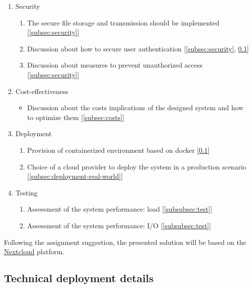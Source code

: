 \begin{enumerate}
    \item{Security}
    \begin{enumerate}
        \itemsep0em
        \item The secure file storage and transmission should be implemented [\ref{subsec:security}]
        \item Discussion about how to secure user authentication [\ref{subsec:security}, \ref{subsec:deployment}]
        \item Discussion about measures to prevent unauthorized access [\ref{subsec:security}]
    \end{enumerate}

    \item{Cost-effectiveness}
    \begin{itemize}
        \itemsep0em
        \item Discussion about the costs implications of the designed system and how to optimize them [\ref{subsec:costs}]
    \end{itemize}

    \item{Deployment}
    \begin{enumerate}
        \itemsep0em
        \item Provision of containerized environment based on docker [\ref{subsec:deployment}]
        \item Choice of a cloud provider to deploy the system in a production scenario [\ref{subsec:deployment-real-world}]
    \end{enumerate}

    \item{Testing}
    \begin{enumerate}
        \itemsep0em
        \item Assessment of the system performance: load [\ref{subsubsec:test}]
        \item Assessment of the system performance: I/O  [\ref{subsubsec:test}]
    \end{enumerate}
\end{enumerate}

Following the assignment suggestion, the presented solution will be based on the \href{https://nextcloud.com/}{Nextcloud} platform.

\subsection{Technical deployment details}
\label{subsec:deployment}

